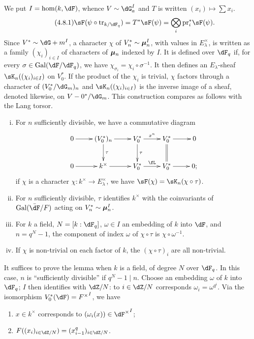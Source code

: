We put $I=\hom(k,\dF)$, whence $V\sim \dG_a^I$ and $T$ is written
$(x_i)\mapsto \sum x_i$. 
\begin{equation*}\tag{4.8.1}\label{VI:eq:4-8-1}
  \sF(\psi\circ \tr_{k/\dF_q}) = T^\ast \sF(\psi) = \bigotimes_i \pr_i^\ast \sF(\psi) \text{.} 
\end{equation*}
Since $V^\ast\sim \dG+m^I$, a character $\chi$ of $V_n^\ast\sim {\bm\mu}_n^I$,
with values in $E_\lambda^\times$, is written as a family
$(\chi_i)_{i\in I}$ of characters of ${\bm\mu}_n$ indexed by $I$. It is
defined over $\dF_q$ if, for every $\sigma\in \gal(\dF/\dF_q)$, we have
$\chi_{\sigma_i} = \chi_i\circ \sigma^{-1}$. It then defines an
$E_\lambda$-sheaf $\sK_n((\chi_i)_{i\in I})$ on $V_0^\ast$. If the product
of the $\chi_i$ is trivial, $\chi$ factors through a character of
$(V_0^\ast/\dG_m)_n$ and $\sK_n((\chi_i)_{i\in I})$ is the inverse image
of a sheaf, denoted likewise, on $V-0^\ast/\dG_m$. This construction
compares as follows with the Lang torsor. 





\begin{lemma_}\label{VI:4-9}
\begin{enumerate}[(i)]
  \item For $n$ sufficiently divisible, we have a commutative diagram
    \[\xymatrix{
      0 \ar[r] 
        & (V_0^\ast)_n \ar[r] \ar[d]^-\tau 
        & V_0^\ast \ar[r]^-{x^n} \ar[d]^-\tau 
        & V_0^\ast \ar[r] \ar@{=}[d] 
        & 0 \\
      0 \ar[r] 
        & k^\times \ar[r] 
        & V_0^\ast \ar[r]^-\fL 
        & V_0^\ast \ar[r] 
        & 0 \text{;} 
    }\]
    if $\chi$ is a character $\chi:k^\times \to E_\lambda^\times$, we have
    $\sF(\chi) = \sK_n(\chi\circ\tau)$.
  \item For $n$ sufficiently divisible, $\tau$ identifies $k^\times$ with the coinvariants
    of $\gal(\bar\dF/F)$ acting on $V_n^\ast\sim {\bm\mu}_n^I$.
  \item For $k$ a field, $N=[k:\dF_q]$, $\omega\in I$ an embedding of $k$
    into $\dF$, and $n=q^N-1$, the component of index $\omega$ of
    $\chi\circ\tau$ is $\chi\circ \omega^{-1}$.
  \item If $\chi$ is non-trivial on each factor of $k$, the
    $(\chi\circ \tau)_i$ are all non-trivial.
\end{enumerate}
\end{lemma_}

It suffices to prove the lemma when $k$ is a field, of degree $N$ over
$\dF_q$. In this case, $n$ is ``sufficiently divisible'' if $q^N-1\mid n$.
Choose an embedding $\omega$ of $k$ into $\dF_q$; $I$ then identifies
with $\dZ/N$: to $i\in \dZ/N$ corresponds $\omega_i=\omega^{q^i}$. Via
the isomorphism $V_0^\ast(\dF) = {F^\times}^I$, we have 
\begin{enumerate}[\indent a)]
  \item $x\in k^\times$ corresponds to $(\omega_i(x))\in {\dF^\times}^I$;
  \item $F((x_i)_{i\in \dZ/N})=(x_{i-1}^q)_{i\in \dZ/N}$.
\end{enumerate}

